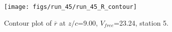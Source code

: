 \begin{figure}[H]
\centering
\texttt{[image: figs/run\_45/run\_45\_R\_contour]}
\caption{Contour plot of $\overline{r}$ at $z/c$=9.00, $V_{free}$=23.24, station 5.}
\label{fig:run_45_R_contour}
\end{figure}


